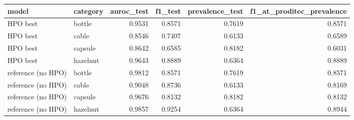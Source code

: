 \begin{tabular}{llrrrr}
\toprule
             model & category &  auroc\_test &  f1\_test &  prevalence\_test &  f1\_at\_proditec\_prevalence \\
\midrule
          HPO best &   bottle &      0.9531 &   0.8571 &           0.7619 &                     0.8571 \\
          HPO best &    cable &      0.8546 &   0.7407 &           0.6133 &                     0.6589 \\
          HPO best &  capsule &      0.8642 &   0.6585 &           0.8182 &                     0.6031 \\
          HPO best & hazelnut &      0.9643 &   0.8889 &           0.6364 &                     0.8889 \\
reference (no HPO) &   bottle &      0.9812 &   0.8571 &           0.7619 &                     0.8571 \\
reference (no HPO) &    cable &      0.9048 &   0.8736 &           0.6133 &                     0.8169 \\
reference (no HPO) &  capsule &      0.9676 &   0.8132 &           0.8182 &                     0.8132 \\
reference (no HPO) & hazelnut &      0.9857 &   0.9254 &           0.6364 &                     0.8944 \\
\bottomrule
\end{tabular}

